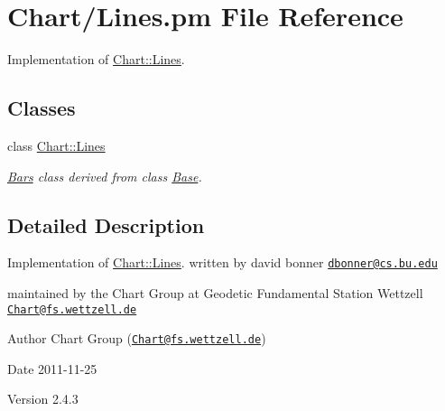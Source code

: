 \hypertarget{Lines_8pm}{
\section{Chart/Lines.pm File Reference}
\label{Lines_8pm}
}


Implementation of \hyperlink{classChart_1_1Lines}{Chart::Lines}.  


\subsection*{Classes}
\begin{DoxyCompactItemize}
\item 
class \hyperlink{classChart_1_1Lines}{Chart::Lines}
\begin{DoxyCompactList}\small\item\em \hyperlink{classChart_1_1Bars}{Bars} class derived from class \hyperlink{classChart_1_1Base}{Base}. \item\end{DoxyCompactList}\end{DoxyCompactItemize}


\subsection{Detailed Description}
Implementation of \hyperlink{classChart_1_1Lines}{Chart::Lines}. written by david bonner \href{mailto:dbonner@cs.bu.edu}{\tt dbonner@cs.bu.edu}

maintained by the Chart Group at Geodetic Fundamental Station Wettzell \href{mailto:Chart@fs.wettzell.de}{\tt Chart@fs.wettzell.de} \begin{DoxyAuthor}{Author}
Chart Group (\href{mailto:Chart@fs.wettzell.de}{\tt Chart@fs.wettzell.de}) 
\end{DoxyAuthor}
\begin{DoxyDate}{Date}
2011-\/11-\/25 
\end{DoxyDate}
\begin{DoxyVersion}{Version}
2.4.3 
\end{DoxyVersion}
